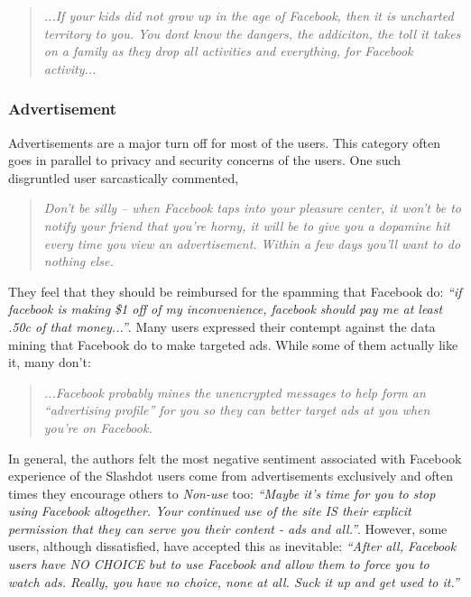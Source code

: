     \begin{quote}
         \textit{...If your kids did not grow up in the age of Facebook, then it is uncharted territory to you. You dont know the dangers, the addiciton, the toll it takes on a family as they drop all activities and everything, for Facebook activity...}
         
\end{quote}
    
 \subsubsection{Advertisement}
 Advertisements are a major turn off for most of the users. This category often goes in parallel to privacy and security concerns of the users. One such disgruntled user sarcastically commented, 
     \begin{quote}
         \textit{Don't be silly -- when Facebook taps into your pleasure center, it won't be to notify your friend that you're horny, it will be to give you a dopamine hit every time you view an advertisement. Within a few days you'll want to do nothing else. }
     \end{quote}
     
     They feel that they should be reimbursed for the spamming that Facebook do: \textit{``if facebook is making \$1 off of my inconvenience, facebook should pay me at least .50c of that money...''}. Many users expressed their contempt against the data mining that Facebook do to make targeted ads. While some of them actually like it, many don't:
     \begin{quote}
         \textit{...Facebook probably mines the unencrypted messages to help form an ``advertising profile'' for you so they can better target ads at you when you're on Facebook.}
    \end{quote}
    
    In general, the authors felt the most negative sentiment associated with Facebook experience of the Slashdot users come from advertisements exclusively and often times they encourage others to \emph{Non-use} too: \textit{``Maybe it's time for you to stop using Facebook altogether. Your continued use of the site IS their explicit permission that they can serve you their content - ads and all.''}. However, some users, although dissatisfied, have accepted this as inevitable: \textit{``After all, Facebook users have NO CHOICE but to use Facebook and allow them to force you to watch ads. Really, you have no choice, none at all. Suck it up and get used to it.''}
    
